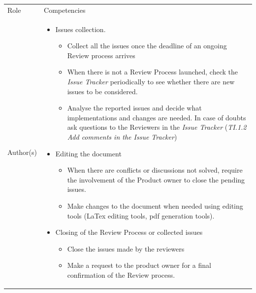 \documentclass{template/openetcs_article}
\begin{document}
\begin{flushleft}
\begin{tabular}{|m{3cm}|m{11cm}|}
\hline
\rowcolor{myblue}
\multicolumn{2}{|c|}{Roles} \\\hline
\rowcolor{lightgray}
Role &
Competencies \\\hline
Author(s) & 
\begin{itemize}
\item Issues collection. 
\begin{itemize}
\item Collect all the issues once the deadline of an ongoing Review process arrives 
\item When there is not a Review Process launched, check the {\it Issue Tracker} periodically to see whether there are new issues to be considered.
\item Analyse the reported issues and decide what implementations and changes are needed. In case of doubts ask questions to the Reviewers in the {\it Issue Tracker} ({\it TI.1.2 Add comments in the Issue Tracker})
\end{itemize}
\item Editing the document
\begin{itemize}
\item When there are conflicts or discussions not solved, require the involvement of the Product owner to close the pending issues. 
\item Make changes to the document when needed using editing tools (LaTex editing tools, pdf generation tools).
\end{itemize}
\item Closing of the Review Process or collected issues
\begin{itemize}
\item Close the issues made by the reviewers 
\item Make a request to the product owner for a final confirmation of the Review process. 
\end{itemize}
\end{itemize}
\\\hline
\end{tabular}
\end{flushleft}
\end{document}
